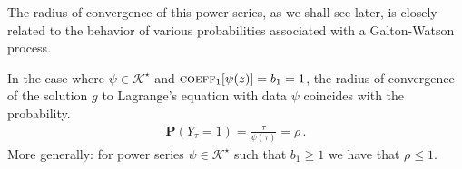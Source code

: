 \documentclass[11pt,a4paper,leqno]{amsart}
\theoremstyle{plain}
\theoremstyle{definition}
\numberwithin{equation}{section}
\def\D{\mathbb{D}}
\def\P{\mathbf{P}}
\begin{document}
%	
%	
	
	
	The radius of convergence of this power series, as we shall see later, is closely related to the behavior of various probabilities associated with a Galton-Watson process.
	
	\smallskip
	In the case where \( \psi \in \mathcal{K}^{\star} \) and \( \textsc{coeff}_1[\psi(z)] = b_1 = 1 \), the radius of convergence of the solution \( g \) to Lagrange's equation with data \( \psi \) coincides with the probability.
	\begin{align*}
		\P(Y_{\tau} = 1) = \frac{\tau}{\psi(\tau)} = \rho\,. 
	\end{align*}
	More generally: for power series \( \psi \in \mathcal{K}^{\star} \) such that \( b_1 \geq 1 \) we have that \( \rho \leq 1 \).
	\smallskip
	
\end{document}
